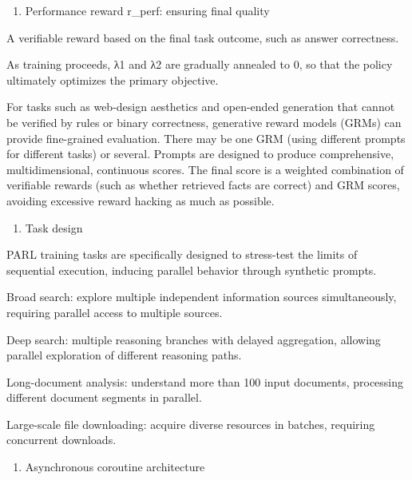 \begin{enumerate}
\def\labelenumi{(\arabic{enumi})}
\setcounter{enumi}{2}
\tightlist
\item
  Performance reward r\_perf: ensuring final quality
\end{enumerate}

A verifiable reward based on the final task outcome, such as answer correctness.

As training proceeds, λ1 and λ2 are gradually annealed to 0, so that the policy ultimately optimizes the primary objective.

For tasks such as web-design aesthetics and open-ended generation that cannot be verified by rules or binary correctness, generative reward models (GRMs) can provide fine-grained evaluation. There may be one GRM (using different prompts for different tasks) or several. Prompts are designed to produce comprehensive, multidimensional, continuous scores. The final score is a weighted combination of verifiable rewards (such as whether retrieved facts are correct) and GRM scores, avoiding excessive reward hacking as much as possible.

\begin{enumerate}
\def\labelenumi{\arabic{enumi}.}
\setcounter{enumi}{3}
\tightlist
\item
  Task design
\end{enumerate}

PARL training tasks are specifically designed to stress-test the limits of sequential execution, inducing parallel behavior through synthetic prompts.

Broad search: explore multiple independent information sources simultaneously, requiring parallel access to multiple sources.

Deep search: multiple reasoning branches with delayed aggregation, allowing parallel exploration of different reasoning paths.

Long-document analysis: understand more than 100 input documents, processing different document segments in parallel.

Large-scale file downloading: acquire diverse resources in batches, requiring concurrent downloads.

\begin{enumerate}
\def\labelenumi{\arabic{enumi}.}
\setcounter{enumi}{4}
\tightlist
\item
  Asynchronous coroutine architecture
\end{enumerate}

